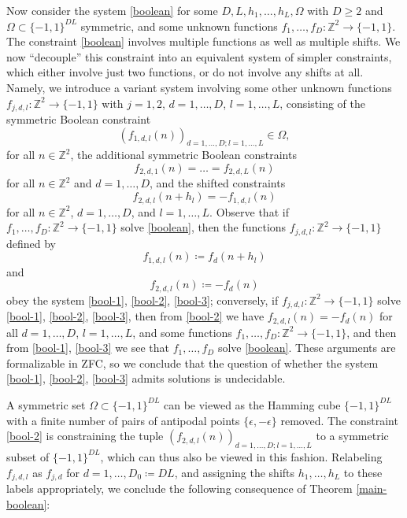 \documentclass[reqno,a4paper,12pt]{amsart}
\numberwithin{equation}{section}
\numberwithin{figure}{section}
\def\Z{\mathbb{Z}}
\renewcommand\geq{\geqslant}
\theoremstyle{plain}
\theoremstyle{definition}
\begin{document}
Now consider the system \eqref{boolean} for some $D,L,h_1,\dots,h_L,\Omega$ with $D \geq 2$ and $\Omega \subset \{-1,1\}^{DL}$ symmetric, and some unknown functions $f_1,\dots,f_D \colon \Z^2 \to \{-1,1\}$.  The constraint \eqref{boolean} involves multiple functions as well as multiple shifts.  We now ``decouple'' this constraint into an equivalent system of simpler constraints, which either involve just two functions, or do not involve any shifts at all.  Namely, we introduce a variant system involving some other unknown functions $f_{j,d,l} \colon \Z^2 \to \{-1,1\}$ with $j=1,2$, $d=1,\dots,D$, $l=1,\dots,L$, consisting of the symmetric Boolean constraint
\begin{equation}\label{bool-1}
(f_{1,d,l}(n))_{d=1,\dots,D; l=1,\dots,L} \in \Omega,
\end{equation}
for all $n \in \Z^2$, the additional symmetric Boolean constraints
\begin{equation}\label{bool-2}
f_{2,d,1}(n) = \dots = f_{2,d,L}(n)
\end{equation}
for all $n \in \Z^2$ and $d=1,\dots,D$, and the shifted constraints
\begin{equation}\label{bool-3}
f_{2,d,l}(n+h_l) = - f_{1,d,l}(n)
\end{equation}
for all $n \in \Z^2$, $d=1,\dots,D$, and $l=1,\dots,L$.  Observe that if $f_1,\dots,f_D \colon \Z^2 \to \{-1,1\}$ solve \eqref{boolean}, then the functions $f_{j,d,l} \colon\Z^2 \to \{-1,1\}$ defined by
$$ f_{1,d,l}(n) \coloneqq f_d(n+h_l)$$
and
$$ f_{2,d,l}(n) \coloneqq - f_d(n)$$
obey the system \eqref{bool-1}, \eqref{bool-2}, \eqref{bool-3}; conversely, if $f_{j,d,l} \colon \Z^2 \to \{-1,1\}$ solve \eqref{bool-1}, \eqref{bool-2}, \eqref{bool-3}, then from \eqref{bool-2} we have $f_{2,d,l}(n) = -f_d(n)$ for all $d=1,\dots,D$, $l=1,\dots,L$, and some functions $f_1,\dots,f_D \colon \Z^2 \to \{-1,1\}$, and then from \eqref{bool-1}, \eqref{bool-3} we see that $f_1,\dots,f_D$ solve \eqref{boolean}.  These arguments are formalizable in ZFC, so we conclude that the question of whether the system \eqref{bool-1}, \eqref{bool-2}, \eqref{bool-3} admits solutions is undecidable.

A symmetric set $\Omega \subset \{-1,1\}^{DL}$ can be viewed as the Hamming cube $\{-1,1\}^{DL}$ with a finite number of pairs of antipodal points $\{\epsilon, -\epsilon\}$ removed.  The constraint \eqref{bool-2} is constraining the tuple $(f_{2,d,l}(n))_{d=1,\dots,D; l=1,\dots,L}$ to a symmetric subset of $\{-1,1\}^{DL}$, which can thus also be viewed in this fashion.  Relabeling $f_{j,d,l}$ as $f_{j,d}$ for $d=1,\dots,D_0 \coloneqq DL$, and assigning the shifts $h_1,\dots,h_L$ to these labels appropriately, we conclude the following consequence of Theorem \ref{main-boolean}:
\end{document}
